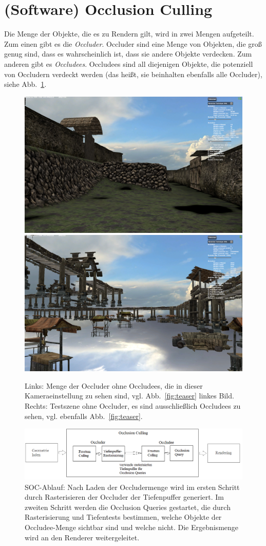 \documentclass[journal]{vgtc}
\begin{document}
\section{(Software) Occlusion Culling}
Die Menge der Objekte, die es zu Rendern gilt, wird in zwei Mengen aufgeteilt.
Zum einen gibt es die \textit{Occluder}.
Occluder sind eine Menge von Objekten, die gro{\ss} genug sind, dass es wahrscheinlich ist, dass sie andere Objekte verdecken.
Zum anderen gibt es \textit{Occludees}.
Occludees sind all diejenigen Objekte, die potenziell von Occludern verdeckt werden (das hei{\ss}t, sie beinhalten ebenfalls alle Occluder), siehe Abb.\ \ref{fig:objects}.
\begin{figure}%
\includegraphics[width=0.5\columnwidth]{images/Occluder.png}%
\includegraphics[width=0.5\columnwidth]{images/Occludees.png}%
\caption{Links: Menge der Occluder ohne Occludees, die in dieser Kameraeinstellung zu sehen sind, vgl. Abb.\ \ref{fig:teaser} linkes Bild. Rechts: Testszene ohne Occluder, es sind ausschlie{\ss}lich Occludees zu sehen, vgl. ebenfalls Abb.\ \ref{fig:teaser}.}%
\label{fig:objects}%
\end{figure}
\begin{figure}%
	\includegraphics[width=\columnwidth]{images/SOCAblauf3.png}%
	\caption{SOC-Ablauf: Nach Laden der Occludermenge wird im ersten Schritt durch Rasterisieren der Occluder der Tiefenpuffer generiert. Im zweiten Schritt werden die Occlusion Queries gestartet, die durch Rasterisierung und Tiefentests bestimmen, welche Objekte der Occludee-Menge sichtbar sind und welche nicht. Die Ergebnismenge wird an den Renderer weitergeleitet.}%
	\label{fig:socablauf}%
\end{figure}
\end{document}
